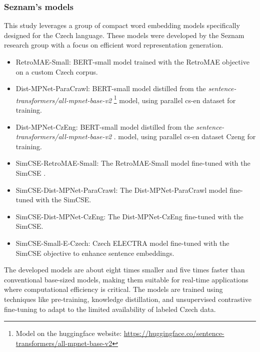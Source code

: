 \subsubsection{Seznam's models \cite{seznam-models}}
This study leverages a group of compact word embedding models specifically designed for the Czech language.
These models were developed by the Seznam research group with a focus on efficient word representation generation.

\begin{itemize}
  \item RetroMAE-Small: \ac{BERT}-small model trained with the \ac{RetroMAE} objective \cite{RetroMAE} on a custom Czech corpus.
  \item Dist-MPNet-ParaCrawl: \ac{BERT}-small model distilled from the \textit{sentence-transformers/all-mpnet-base-v2} \footnote{\label{hf_all-mpnet-base-v2} Model on the huggingface website: \url{https://huggingface.co/sentence-transformers/all-mpnet-base-v2}} model, using parallel cs-en dataset  \cite{ParaCrawl} for training.
  \item Dist-MPNet-CzEng: \ac{BERT}-small model distilled from the \textit{sentence-transformers/all-mpnet-base-v2}  . model, using parallel cs-en dataset Czeng \cite{CzEng_dataset} for training.
  \item SimCSE-RetroMAE-Small: The \ac{RetroMAE}-Small model fine-tuned with the \ac{SimCSE} \cite{SimCSE}.
  \item SimCSE-Dist-MPNet-ParaCrawl: The Dist-MPNet-ParaCrawl model fine-tuned with the \ac{SimCSE}.
  \item SimCSE-Dist-MPNet-CzEng: The Dist-MPNet-CzEng fine-tuned with the \ac{SimCSE}.
  \item SimCSE-Small-E-Czech: Czech ELECTRA model \cite{small-e-czech} fine-tuned with the \ac{SimCSE} objective to enhance sentence embeddings.
\end{itemize}

The developed models are about eight times smaller and five times faster than conventional base-sized models, making them suitable for real-time applications where computational efficiency is critical.
The models are trained using techniques like pre-training, knowledge distillation, and unsupervised contrastive fine-tuning to adapt to the limited availability of labeled Czech data.


